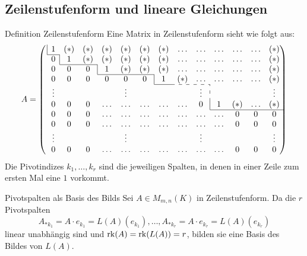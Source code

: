 \documentclass[main.tex]{subfiles}
\begin{document}
\subsection*{Zeilenstufenform und lineare Gleichungen}
\begin{karte}{Definition Zeilenstufenform}
    Eine Matrix in Zeilenstufenform sieht wie folgt aus:
    \begin{equation*}
        A =
        \left(\mkern3mu
          \begin{array}{*{13}c}
            \multicolumn{1}{|c}{1} & (*) & (*) & (*) & (*) & (*) & (*) & \ldots & \ldots & \ldots & \ldots & \ldots & (*) \\
            \cline{1-1}
            0 & \multicolumn{1}{|c}{1} & (*) & (*) & (*) & (*) & (*)  & \ldots & \ldots & \ldots & \ldots & \ldots & (*) \\
            \cline{2-3}
            0 & 0 & 0 & \multicolumn{1}{|c}{1} & (*) & (*) & (*) & \ldots & \ldots & \ldots & \ldots & \ldots & (*)\\
            \cline{4-6}
            0 & 0 & 0 & 0 & 0 & 0 & \multicolumn{1}{|c}{1} & (*) & \ldots & \ldots & \ldots & \ldots & (*) \\
            \cline{7-7}\cdashline{8-9}
            \vdots & & & & \vdots & & & & \vdots & \multicolumn{1}{:c}{} & & & \vdots \\
            0 & 0 & 0 & \ldots & \ldots & \ldots & \ldots & \ldots & 0 & \multicolumn{1}{|c}{1} & (*) & \ldots & (*) \\
            \cline{10-13}
            0 & 0 & 0 & \ldots  & \ldots & \ldots & \ldots & \ldots & \ldots & \ldots & 0 & 0 & 0 \\
            0 & 0 & 0 & \ldots  & \ldots & \ldots & \ldots & \ldots & \ldots & \ldots & 0 & 0 & 0 \\
            \vdots & & & & \vdots & & & & \vdots & & & & \vdots \\
            0 & 0 & 0 & \ldots  & \ldots & \ldots & \ldots & \ldots & \ldots & \ldots & 0 & 0 & 0
          \end{array}
         \hskip-\arraycolsep\right)
      \end{equation*}
      Die Pivotindizes \( k_1,\ldots, k_r \) sind die jeweiligen Spalten, 
      in denen in einer Zeile zum ersten Mal eine \( 1 \) vorkommt.
\end{karte}
\begin{karte}{Pivotspalten als Basis des Bilds}
    Sei \( A \in M_{m,n}(K) \) in Zeilenstufenform.
    Da die \(r\) Pivotspalten 
    \[ A_{*k_1} = A \cdot e_{k_1} = L(A)(e_{k_1}), \ldots, 
    A_{*k_r} = A \cdot e_{k_r} = L(A)(e_{k_r}) \]
    linear unabhängig sind und \( \operatorname{rk}(A) = \operatorname{rk}(L(A)) = r\), 
    bilden sie eine Basis des Bildes von \( L(A)\).
\end{karte}
\end{document}
